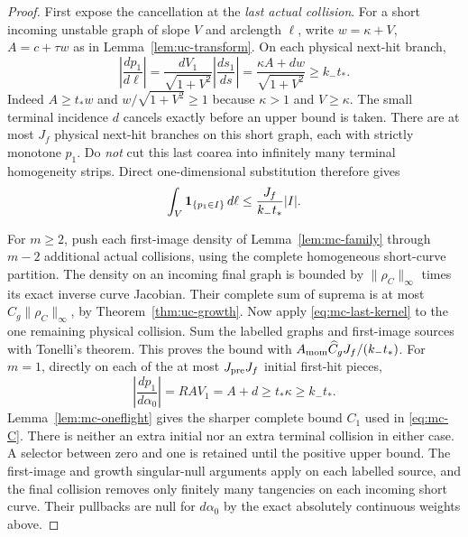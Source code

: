 \begin{proof}
First expose the cancellation at the \emph{last actual collision}.
For a short incoming unstable graph of slope $V$ and arclength $\ell$,
write $w=\kappa+V$, $A=c+\tau w$ as in
Lemma~\ref{lem:uc-transform}. On each physical next-hit branch,
\begin{equation}\label{eq:mc-last-cancellation}
 \left|\frac{dp_1}{d\ell}\right|
  =\frac{d V_1}{\sqrt{1+V^2}}\left|\frac{ds_1}{ds}\right|
  =\frac{\kappa A+dw}{\sqrt{1+V^2}}
  \ge k_-t_*.
\end{equation}
Indeed $A\ge t_*w$ and
$w/\sqrt{1+V^2}\ge1$ because $\kappa>1$ and $V\ge\kappa$.
The small terminal incidence $d$ cancels exactly before an upper
bound is taken. There are at most $J_f$ physical next-hit branches
on this short graph, each with strictly monotone $p_1$. Do \emph{not}
cut this last coarea into infinitely many terminal homogeneity strips.
Direct one-dimensional substitution therefore gives
\begin{equation}\label{eq:mc-last-kernel}
 \int_V\mathbf1_{\{p_1\in I\}}\,d\ell
                      \le\frac{J_f}{k_-t_*}|I|.
\end{equation}

For $m\ge2$, push each first-image density of
Lemma~\ref{lem:mc-family} through $m-2$ additional actual collisions,
using the complete homogeneous short-curve partition. The density on
an incoming final graph is bounded by $\|\rho_C\|_\infty$ times its
exact inverse curve Jacobian. Their complete sum of suprema is at most
$\widehat C_g\|\rho_C\|_\infty$, by
Theorem~\ref{thm:uc-growth}. Now apply \eqref{eq:mc-last-kernel} to
the one remaining physical collision. Sum the labelled graphs and
first-image sources with Tonelli's theorem. This proves the bound
with $A_{\rm mom}\widehat C_gJ_f/(k_-t_*)$.
For $m=1$, directly on each of the at most $J_{\rm pre}J_f$ initial
first-hit pieces,
\[
 \left|\frac{dp_1}{d\alpha_0}\right|
       =R A V_1=A+d\ge t_*\kappa\ge k_-t_*.
\]
Lemma~\ref{lem:mc-oneflight} gives the sharper complete bound $C_1$
used in \eqref{eq:mc-C}. There is neither an
extra initial nor an extra terminal collision in either case.
A selector between zero and one is retained until the positive upper
bound. The first-image and growth singular-null arguments apply on
each labelled source, and the final collision removes only finitely
many tangencies on each incoming short curve. Their pullbacks are null
for $d\alpha_0$ by the exact absolutely continuous weights above.


\end{proof}
